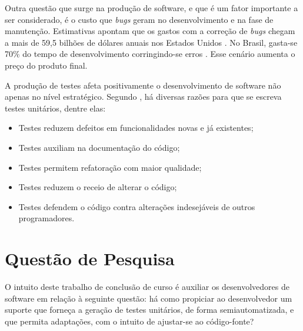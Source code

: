 \par
\indent Outra questão que surge na produção de software, e que é um fator
importante a ser considerado, é o custo que \textit{bugs} geram no
desenvolvimento e na fase de manutenção. Estimativas apontam que os gastos
com a correção de \textit{bugs} chegam a mais de 59,5 bilhões de dólares
anuais nos Estados Unidos \cite{jantti2008}. No Brasil, gasta-se 70\% do
tempo de desenvolvimento corringindo-se erros \cite{janones2010}. Esse
cenário aumenta o preço do produto final.
\par
\indent A produção de testes afeta positivamente o desenvolvimento de
software não apenas no nível estratégico. Segundo ,
há diversas razões para que se escreva testes unitários, dentre elas:
\begin{itemize}
  \item Testes reduzem defeitos em funcionalidades novas e já existentes;

  \item Testes auxiliam na documentação do código;

  \item Testes permitem refatoração com maior qualidade;

  \item Testes reduzem o receio de alterar o código;

  \item Testes defendem o código contra alterações indesejáveis de outros
    programadores.
\end{itemize}

\section{Questão de Pesquisa}
O intuito deste trabalho de conclusão de curso é auxiliar os desenvolvedores
de software em relação à seguinte questão: há como propiciar ao desenvolvedor
um suporte que forneça a geração de testes unitários, de forma
semiautomatizada, e que permita adaptações, com o intuito de ajustar-se ao
código-fonte?

